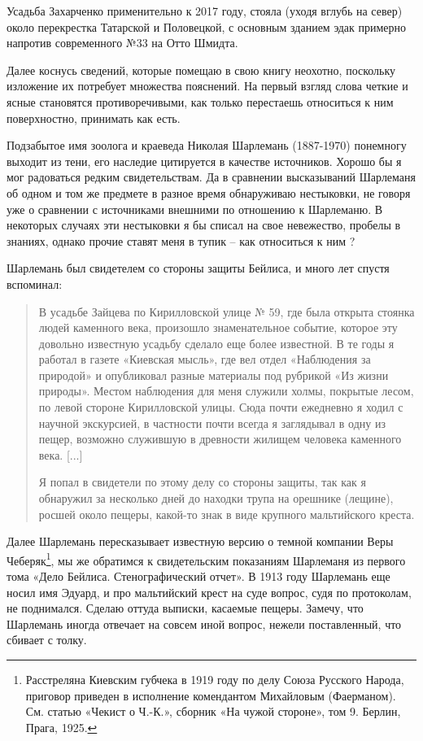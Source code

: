 Усадьба Захарченко применительно к 2017 году, стояла (уходя вглубь на север) около перекрестка Татарской и Половецкой, с основным зданием эдак примерно напротив современного №33 на Отто Шмидта.

Далее коснусь сведений, которые помещаю в свою книгу неохотно, поскольку изложение их потребует множества пояснений. На первый взгляд слова четкие и ясные становятся противоречивыми, как только перестаешь относиться к ним поверхностно, принимать как есть.

Подзабытое имя зоолога и краеведа Николая Шарлемань (1887-1970) понемногу выходит из тени, его наследие цитируется в качестве источников. Хорошо бы я мог радоваться редким свидетельствам. Да в сравнении высказываний Шарлеманя об одном и том же предмете в разное время обнаруживаю нестыковки, не говоря уже о сравнении с источниками внешними по отношению к Шарлеманю. В некоторых случаях эти нестыковки я бы списал на свое невежество, пробелы в знаниях, однако прочие ставят меня в тупик – как относиться к ним ? 

Шарлемань был свидетелем со стороны защиты Бейлиса, и много лет спустя вспоминал\cite{sharl01}:

\begin{quotation}
В усадьбе Зайцева по Кирилловской улице № 59, где была открыта стоянка людей каменного века, произошло знаменательное событие, которое эту довольно известную усадьбу сделало еще более известной. В те годы я работал в газете «Киевская
мысль», где вел отдел «Наблюдения за природой» и опубликовал разные материалы под рубрикой «Из жизни природы». Местом наблюдения для меня служили холмы, покрытые лесом, по левой стороне Кирилловской улицы. Сюда почти ежедневно я ходил с научной экскурсией, в частности почти всегда я заглядывал в одну из пещер, возможно служившую в древности жилищем человека каменного века. [...]

Я попал в свидетели по этому делу со стороны защиты, так как я обнаружил за несколько дней до находки трупа на орешнике (лещине), росшей около пещеры, какой-то знак в виде крупного мальтийского креста.
\end{quotation}

Далее Шарлемань пересказывает известную версию о темной компании Веры Чеберяк\footnote{Расстреляна Киевским губчека в 1919 году по делу Союза Русского Народа, приговор приведен в исполнение комендантом Михайловым (Фаерманом). См. статью «Чекист о Ч.-К.», сборник «На чужой стороне», том 9. Берлин, Прага, 1925.}, мы же обратимся к свидетельским показаниям Шарлеманя из первого тома «Дело Бейлиса. Стенографический отчет». В 1913 году Шарлемань еще носил имя Эдуард, и про мальтийский крест на суде вопрос, судя по протоколам, не поднимался. Сделаю оттуда выписки, касаемые пещеры. Замечу, что Шарлемань иногда отвечает на совсем иной вопрос, нежели поставленный, что сбивает с толку.

